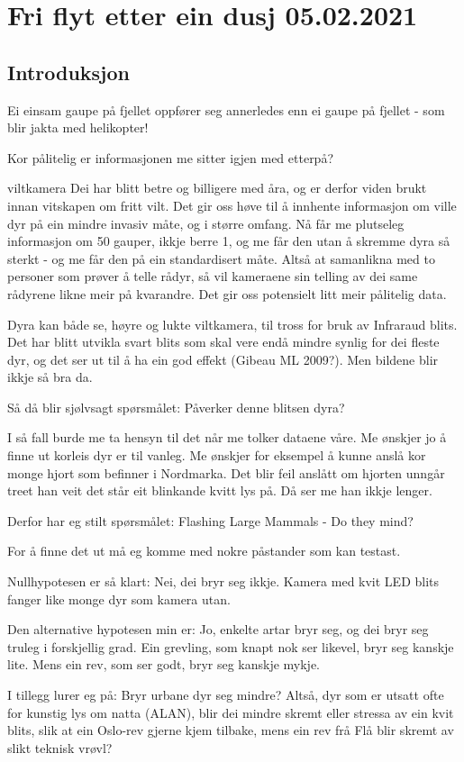 \section{Fri flyt etter ein dusj 05.02.2021} 

\subsection{Introduksjon} 

Ei einsam gaupe på fjellet oppfører seg annerledes enn ei gaupe på fjellet - som blir jakta med helikopter!

Kor pålitelig er informasjonen me sitter igjen med etterpå?

viltkamera
Dei har blitt betre og billigere med åra, og er derfor viden brukt innan vitskapen om fritt vilt. Det gir oss høve til å innhente informasjon om ville dyr på ein mindre invasiv måte, og i større omfang. Nå får me plutseleg informasjon om 50 gauper, ikkje berre 1, og me får den utan å skremme dyra så sterkt - og me får den på ein standardisert måte. Altså at samanlikna med to personer som prøver å telle rådyr, så vil kameraene sin telling av dei same rådyrene likne meir på kvarandre.
Det gir oss potensielt litt meir pålitelig data.


Dyra kan både se, høyre og lukte viltkamera, til tross for bruk av Infraraud blits. Det har blitt utvikla svart blits som skal vere endå mindre synlig for dei fleste dyr, og det ser ut til å ha ein god effekt (Gibeau ML 2009?). Men bildene blir ikkje så bra da.

Så då blir sjølvsagt spørsmålet:  Påverker denne blitsen dyra?

I så fall burde me ta hensyn til det når me tolker dataene våre. Me ønskjer jo å finne ut korleis dyr er til vanleg.
Me ønskjer for eksempel å kunne anslå kor monge hjort som befinner i Nordmarka. Det blir feil anslått om hjorten unngår treet han veit det står eit blinkande kvitt lys på. Då ser me han ikkje lenger.

Derfor har eg stilt spørsmålet: Flashing Large Mammals - Do they mind?


For å finne det ut må eg komme med nokre påstander som kan testast.

Nullhypotesen er så klart: Nei, dei bryr seg ikkje. Kamera med kvit LED blits fanger like monge dyr som kamera utan.

Den alternative hypotesen min er: Jo, enkelte artar bryr seg, og dei bryr seg truleg i forskjellig grad. Ein grevling, som knapt nok ser likevel, bryr seg kanskje lite. Mens ein rev, som ser godt, bryr seg kanskje mykje.

I tillegg lurer eg på: Bryr urbane dyr seg mindre? Altså, dyr som er utsatt ofte for kunstig lys om natta (ALAN), blir dei mindre skremt eller stressa av ein kvit blits, slik at ein Oslo-rev gjerne kjem tilbake, mens ein rev frå Flå blir skremt av slikt teknisk vrøvl?

